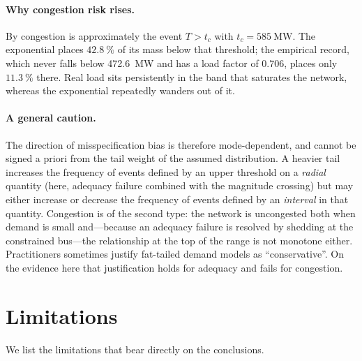 \documentclass[11pt,a4paper]{article}
\theoremstyle{definition}
\theoremstyle{plain}
\theoremstyle{remark}
\begin{document}
\paragraph{Why congestion risk rises.}
By  congestion is approximately the event
$T > t_c$ with $t_c = \SI{585}{\mega\watt}$. The exponential places
$\SI{42.8}{\percent}$ of its mass below that threshold; the empirical record, which
never falls below \SI{472.6}{\mega\watt} and has a load factor of $0.706$, places
only $\SI{11.3}{\percent}$ there. Real load sits persistently in the band that
saturates the network, whereas the exponential repeatedly wanders out of it.

\paragraph{A general caution.}
The direction of misspecification bias is therefore mode-dependent, and cannot be
signed a priori from the tail weight of the assumed distribution. A heavier tail
increases the frequency of events defined by an upper threshold on a
\emph{radial} quantity (here, adequacy failure combined with the magnitude
crossing) but may either increase or decrease the frequency of events defined by
an \emph{interval} in that quantity. Congestion is of the second type: the
network is uncongested both when demand is small and---because an adequacy
failure is resolved by shedding at the constrained bus---the relationship at the
top of the range is not monotone either. Practitioners sometimes justify
fat-tailed demand models as ``conservative''. On the evidence here that
justification holds for adequacy and fails for congestion.

\section{Limitations}\label{sec:limits}

We list the limitations that bear directly on the conclusions.
\end{document}
